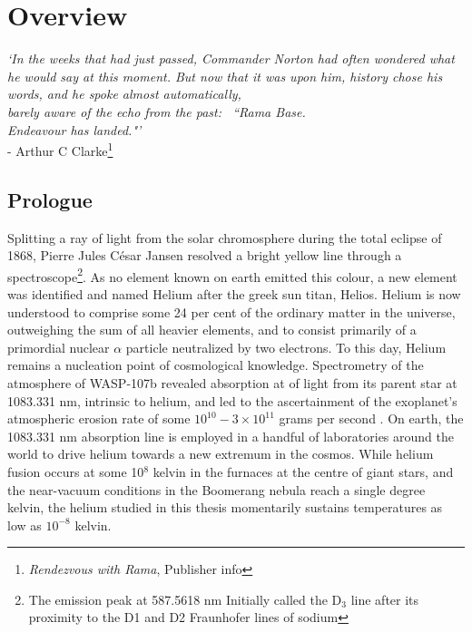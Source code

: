 




\chapter*{Overview}


\begin{adjustwidth}{3cm}{0cm}
\begin{flushright}
{\emph{`In the weeks that had just passed, Commander Norton had often wondered what he would say at this moment.
	But now that it was upon him, history chose his words, and he spoke almost automatically, \\barely aware of the echo from the past: ~``Rama Base.\\ \emph{Endeavour} has landed."'}\\ 
- Arthur C Clarke\footnote{\emph{Rendezvous with Rama}, Publisher info}}
\end{flushright}
\end{adjustwidth}

\section*{Prologue}\label{sec:prologue}


	{Splitting} a ray of light from the solar chromosphere during the total eclipse of 1868, Pierre Jules C\'{e}sar Jansen resolved a bright yellow line through a spectroscope\footnote{The emission peak at 587.5618 nm Initially called the D$_3$ line after its proximity to the D1 and D2 Fraunhofer lines of sodium}. As no element known on earth emitted this colour, a new element was identified and named Helium after the greek sun titan, Helios. Helium is now understood to comprise some 24 per cent of the ordinary matter in the universe, outweighing the sum of all heavier elements, and to consist primarily of a primordial nuclear $\alpha$ particle neutralized by two electrons. To this day, Helium remains a nucleation point of cosmological knowledge. Spectrometry of the atmosphere of WASP-107b revealed absorption at of light from its parent star at 1083.331 nm, intrinsic to helium, and led to the ascertainment of the exoplanet's atmospheric erosion rate of some $10^{10}-3\times10^{11}$ grams per second \cite{Spake18}. On earth, the 1083.331 nm absorption line is employed in a handful of laboratories around the world to drive helium towards a new extremum in the cosmos. While helium fusion occurs at some 10$^8$ kelvin in the furnaces at the centre of giant stars, and the near-vacuum conditions in the Boomerang nebula reach a single degree kelvin, the helium studied in this thesis momentarily sustains temperatures as low as $10^{-8}$ kelvin. 

